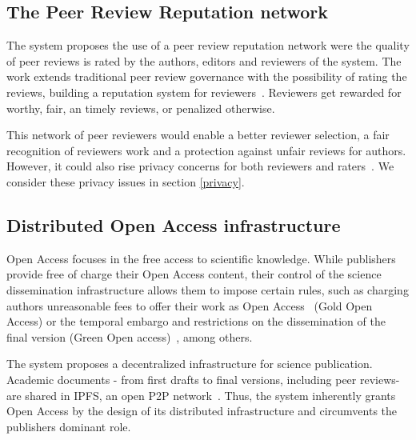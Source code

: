   \subsection{The Peer Review Reputation network}
  \label{reputation}

  The system proposes the use of a peer review reputation network were the
  quality of peer reviews is rated by the authors, editors and reviewers of the
  system. The work extends traditional peer review governance with the
  possibility of rating the reviews, building a reputation system for
  reviewers~\cite{resnick2000reputation}. Reviewers get rewarded for worthy,
  fair, an timely reviews, or penalized otherwise.

  This network of peer reviewers would enable a better reviewer selection, a
  fair recognition of reviewers work and a protection against unfair reviews for
  authors. However, it could also rise privacy concerns for both reviewers and
  raters~\cite{van1999effect,schaub2016trustless}. We consider these privacy
  issues in section \ref{privacy}.


  \subsection{Distributed Open Access infrastructure}
  \label{distributedOA}
  Open Access focuses in the free access to scientific knowledge. While
  publishers provide free of charge their Open Access content, their control of
  the science dissemination infrastructure allows them to impose certain rules,
  such as charging authors unreasonable fees to offer their work as Open
  Access~\cite{solomon2012study} (Gold Open Access) or the temporal embargo and
  restrictions on the dissemination of the final version (Green Open
  access)~\cite{bjork2014anatomy}, among others.

  The system proposes a decentralized infrastructure for science publication.
  Academic documents - from first drafts to final versions, including peer
  reviews- are shared in IPFS, an open P2P
  network~\cite{benet_ipfs-content_2014}. Thus, the system inherently grants
  Open Access by the design of its distributed infrastructure and circumvents
  the publishers dominant role.

